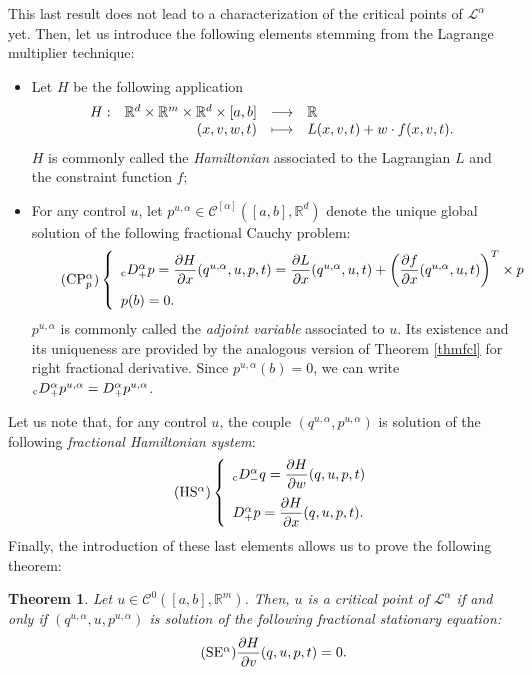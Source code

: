 \documentclass[english,11pt,reqno]{smfart}
\newtheorem{theorem}{Theorem}
\newcommand{\R}{\mathbb{R}}
\newcommand{\LL}{\mathcal{L}}
\newcommand{\CC}{\mathscr{C}}
\newcommand{\cDM}{{}_{{\rm c}} D^\alpha_-}
\newcommand{\cDP}{{}_{{\rm c}} D^\alpha_+}
\newcommand{\DP}{D^\alpha_+}
\newcommand{\fonction}[5]{\begin{array}[t]{lrcl}#1 :&#2 &\longrightarrow &#3\\&#4& \longmapsto &#5 \end{array}}
\begin{document}
This last result does not lead to a characterization of the critical points of $\LL^\alpha$ yet. Then, let us introduce the following elements stemming from the Lagrange multiplier technique:
\begin{itemize}
\item Let $H$ be the following application
\begin{equation}
\fonction{H}{\R^d \times \R^m \times \R^d \times [a,b]}{\R}{(x,v,w,t)}{L(x,v,t)+w \cdot f(x,v,t).}
\end{equation}
$H$ is commonly called the \textit{Hamiltonian} associated to the Lagrangian $L$ and the constraint function $f$;
\item For any control $u$, let $p^{u,\alpha} \in \CC^{[\alpha]} ( [a,b], \R^d )$ denote the unique global solution of the following fractional Cauchy problem:
\begin{equation}\label{eqcpp}\tag{CP${}^\alpha_p$}
 \left\lbrace \begin{array}{l}
         \cDP p = \dfrac{\partial H}{\partial x}(q^{u,\alpha},u,p,t) = \dfrac{\partial L}{\partial x}(q^{u,\alpha},u,t) + \left( \dfrac{\partial f}{\partial x}(q^{u,\alpha},u,t)\right)^T \times p \\[10pt]
	     p(b) = 0.
        \end{array}
\right.
\end{equation}
$p^{u,\alpha}$ is commonly called the \textit{adjoint variable} associated to $u$. Its existence and its uniqueness are provided by the analogous version of Theorem \ref{thmfcl} for right fractional derivative. Since $p^{u,\alpha} (b) = 0$, we can write $\cDP p^{u,\alpha} = \DP p^{u,\alpha}$.
\end{itemize}
Let us note that, for any control $u$, the couple $(q^{u,\alpha},p^{u,\alpha})$ is solution of the following \textit{fractional Hamiltonian system}:
\begin{equation}\tag{HS${}^\alpha$}\label{eqhs}
 \left\lbrace \begin{array}{l}
 		 \cDM q = \dfrac{\partial H}{\partial w} (q,u,p,t) \\[10pt]
 		\DP p = \dfrac{\partial H}{\partial x} (q,u,p,t).
        \end{array}
\right.
\end{equation}
Finally, the introduction of these last elements allows us to prove the following theorem:
\begin{theorem}\label{thmfinal}
Let $u \in \CC^0 ([a,b],\R^m)$. Then, $u$ is a critical point of $\LL^{\alpha}$ if and only if $(q^{u,\alpha},u,p^{u,\alpha})$ is solution of the following \textit{fractional stationary equation}:
\begin{equation}\tag{SE${}^\alpha$}\label{eqse}
\dfrac{\partial H}{\partial v} (q,u,p,t) = 0.
\end{equation}
\end{theorem}
\end{document}
